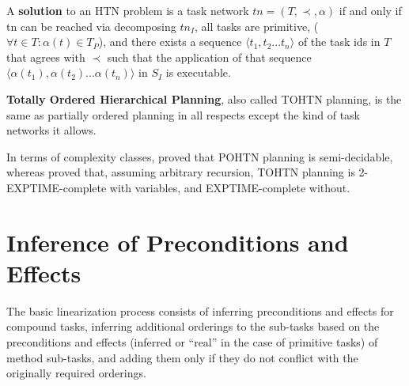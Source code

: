 \documentclass[letterpaper]{article} %
\begin{document}
A \textbf{solution} to an HTN problem is a task network $tn = (T, \prec, \alpha)$ if and only if
tn can be reached via decomposing $tn_I$, all tasks are primitive, ($\forall t \in T: \alpha(t) \in T_P$), and there exists a sequence $\langle t_1, t_2 ... t_n \rangle$ of the task ids in $T$ that agrees with $\prec$ such that the application of that sequence $\langle \alpha(t_1), \alpha(t_2) ... \alpha(t_n) \rangle$ in $S_I$ is executable.



\textbf{Totally Ordered Hierarchical Planning}, also called TOHTN planning, is the same as partially ordered planning in all respects except the kind of task networks it allows.

In terms of complexity classes, \cite{ErolHTNExpressivity} proved that POHTN planning is semi-decidable, whereas \cite{Alford2015TightHTNBounds} proved that, assuming arbitrary recursion, TOHTN planning is 2-EXPTIME-complete with variables, and EXPTIME-complete without. 


\section{Inference of Preconditions and Effects}
The basic linearization process consists of inferring preconditions and effects for compound tasks, inferring additional orderings to the sub-tasks based on the preconditions and effects (inferred or \enquote{real} in the case of primitive tasks) of method sub-tasks, and adding them only if they do not conflict with the originally required orderings.
 
\end{document}
